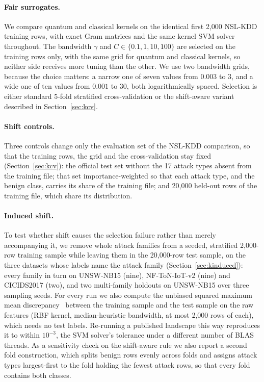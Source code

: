 \documentclass[preprint,11pt]{elsarticle}
\begin{document}
\paragraph{Fair surrogates.} We compare quantum and classical kernels on the identical first 2{,}000
NSL-KDD training rows, with exact Gram matrices and the same kernel SVM solver throughout. The bandwidth $\gamma$ and
$C\in\{0.1,1,10,100\}$ are selected on the training rows only, with the same grid for quantum and
classical kernels, so neither side receives more tuning than the other. We use two bandwidth grids,
because the choice matters: a narrow one of seven values from $0.003$ to $3$, and a wide one of ten
values from $0.001$ to $30$, both logarithmically spaced. Selection is either standard 5-fold
stratified cross-validation or the shift-aware variant described in Section~\ref{sec:kcv}.

\paragraph{Shift controls.} Three controls change only the evaluation set of the NSL-KDD comparison, so
that the training rows, the grid and the cross-validation stay fixed (Section~\ref{sec:kcv}): the
official test set without the 17 attack types absent from the training file; that set importance-weighted
so that each attack type, and the benign class, carries its share of the training file; and 20{,}000
held-out rows of the training file, which share its distribution.

\paragraph{Induced shift.} To test whether shift causes the selection failure rather than merely
accompanying it, we remove whole attack families from a seeded, stratified 2{,}000-row training sample
while leaving them in the 20{,}000-row test sample, on the three datasets whose labels name the attack
family (Section~\ref{sec:kinduced}): every family in turn on UNSW-NB15 (nine), NF-ToN-IoT-v2 (nine) and
CICIDS2017 (two), and two multi-family holdouts on UNSW-NB15 over three sampling seeds. For every run we
also compute the unbiased squared maximum mean discrepancy~\cite{gretton2012kernel} between the training
sample and the test sample on the raw features (RBF kernel, median-heuristic bandwidth, at most 2{,}000
rows of each), which needs no test labels. Re-running a published landscape this way reproduces it to
within $10^{-3}$, the SVM solver's tolerance under a different number of BLAS threads. As a sensitivity
check on the shift-aware rule we also report a second fold construction, which splits benign rows evenly
across folds and assigns attack types largest-first to the fold holding the fewest attack rows, so that
every fold contains both classes.
\end{document}
